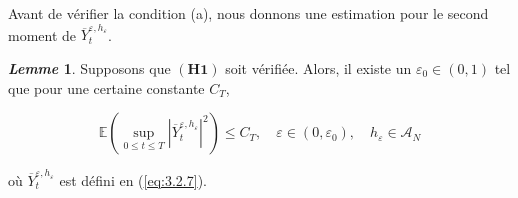 \documentclass[12pt,a4paper,twoside]{report}%
\theoremstyle{definition}
\newtheorem{lem}[dfn]{\textit{Lemme}}
\numberwithin{equation}{section}
\begin{document}
Avant de vérifier la condition (a), nous donnons une estimation pour le second moment de \(\overline{Y}_{t}^{\varepsilon,h_{\varepsilon}}\).	 
\begin{lem}\label{lem:3.2.6}
	Supposons que \((\mathbf{H1})\) soit vérifiée. Alors, il existe un \(\varepsilon_{0}\in(0,1)\) tel que pour une certaine constante \(C_{T}\),
	
	\begin{equation}\label{eq:3.2.10}
		\mathbb{E} \left( \sup_{0\leq t\leq T} |\overline{Y}_{t}^{\varepsilon,h_{\varepsilon}}|^{2} \right) \leq C_{T}, \quad \varepsilon \in (0,\varepsilon_{0}), \quad h_{\varepsilon} \in \mathcal{A}_{N}
	\end{equation}
	
	où \(\overline{Y}_{t}^{\varepsilon,h_{\varepsilon}}\) est défini en (\ref{eq:3.2.7}).
\end{lem}
\end{document}
